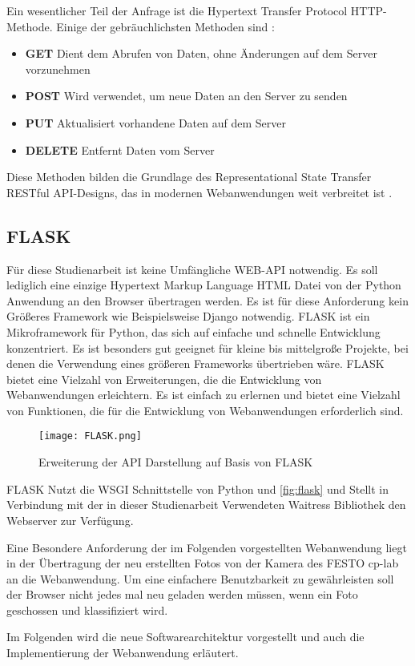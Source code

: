 Ein wesentlicher Teil der Anfrage ist die Hypertext Transfer Protocol \ac{HTTP}-Methode. Einige der gebräuchlichsten Methoden sind \cite{rodriguez_rest_2016}:
\begin{itemize}
    \item \textbf{GET} Dient dem Abrufen von Daten, ohne Änderungen auf dem Server vorzunehmen
    \item \textbf{POST} Wird verwendet, um neue Daten an den Server zu senden
    \item \textbf{PUT} Aktualisiert vorhandene Daten auf dem Server
    \item \textbf{DELETE} Entfernt Daten vom Server
\end{itemize}

Diese Methoden bilden die Grundlage des Representational State Transfer \ac{REST}ful API-Designs, das in modernen Webanwendungen weit verbreitet ist \cite{rodriguez_rest_2016}.

\subsection{FLASK} \label{subsec:flask}  %

Für diese Studienarbeit ist keine Umfängliche WEB-\ac{API} notwendig. Es soll lediglich eine einzige Hypertext Markup Language \ac{HTML} Datei von der Python Anwendung an den Browser übertragen werden. Es ist für diese Anforderung kein Größeres Framework wie Beispielsweise Django notwendig. FLASK ist ein Mikroframework für Python, das sich auf einfache und schnelle Entwicklung konzentriert. Es ist besonders gut geeignet für kleine bis mittelgroße Projekte, bei denen die Verwendung eines größeren Frameworks übertrieben wäre. FLASK bietet eine Vielzahl von Erweiterungen, die die Entwicklung von Webanwendungen erleichtern. Es ist einfach zu erlernen und bietet eine Vielzahl von Funktionen, die für die Entwicklung von Webanwendungen erforderlich sind.

\begin{figure}[h]
    \centering
    \texttt{[image: FLASK.png]}
    \caption{Erweiterung der API Darstellung auf Basis von FLASK}
    \label{fig:flask}
\end{figure}

FLASK Nutzt die \ac{WSGI} Schnittstelle von Python \cite{flask_welcome_nodate} und  \autoref{fig:flask} und Stellt in Verbindung mit der in dieser Studienarbeit Verwendeten Waitress Bibliothek den Webserver zur Verfügung.

Eine Besondere Anforderung der im Folgenden vorgestellten Webanwendung liegt in der Übertragung der neu erstellten Fotos von der Kamera des FESTO \ac{cp-lab} an die 
Webanwendung. Um eine einfachere Benutzbarkeit zu gewährleisten soll der Browser nicht jedes mal neu geladen werden müssen, wenn ein Foto geschossen und klassifiziert wird.

Im Folgenden wird die neue Softwarearchitektur vorgestellt und auch die Implementierung der Webanwendung erläutert.